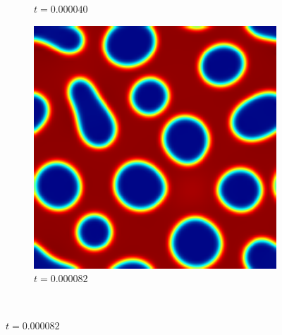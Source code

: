 \begin{figure}[ht]
\begin{subfigure}[t]{.3\linewidth}
		\vspace{-.4\baselineskip}
		\caption{{$t=0.000040$}}
	\end{subfigure}
	\begin{subfigure}[t]{.3\linewidth}
		\center
		\includegraphics[scale=.25]{stochastic_ch_5_82}
		\vspace{-.4\baselineskip}
		\caption{{$t=0.000082$}}
	\end{subfigure}\\
	\vspace{.2\baselineskip}


\end{figure}
